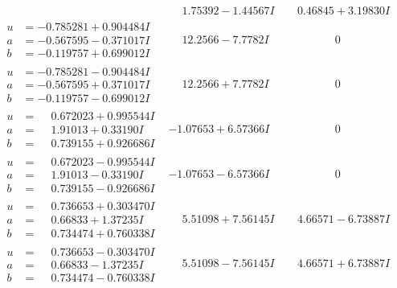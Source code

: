 \documentclass[1p]{elsarticle_modified}
\theoremstyle{definition}
\begin{document}
$$\begin{array}{c|c|c}
 & \phantom{-}1.75392 - 1.44567 I & \phantom{-}0.46845 + 3.19830 I \\ \hline\begin{aligned}
u &= -0.785281 + 0.904484 I \\
a &= -0.567595 - 0.371017 I \\
b &= -0.119757 + 0.699012 I\end{aligned}
 & \phantom{-}12.2566 - 7.7782 I & \phantom{-0.000000 } 0 \\ \hline\begin{aligned}
u &= -0.785281 - 0.904484 I \\
a &= -0.567595 + 0.371017 I \\
b &= -0.119757 - 0.699012 I\end{aligned}
 & \phantom{-}12.2566 + 7.7782 I & \phantom{-0.000000 } 0 \\ \hline\begin{aligned}
u &= \phantom{-}0.672023 + 0.995544 I \\
a &= \phantom{-}1.91013 + 0.33190 I \\
b &= \phantom{-}0.739155 + 0.926686 I\end{aligned}
 & -1.07653 + 6.57366 I & \phantom{-0.000000 } 0 \\ \hline\begin{aligned}
u &= \phantom{-}0.672023 - 0.995544 I \\
a &= \phantom{-}1.91013 - 0.33190 I \\
b &= \phantom{-}0.739155 - 0.926686 I\end{aligned}
 & -1.07653 - 6.57366 I & \phantom{-0.000000 } 0 \\ \hline\begin{aligned}
u &= \phantom{-}0.736653 + 0.303470 I \\
a &= \phantom{-}0.66833 + 1.37235 I \\
b &= \phantom{-}0.734474 + 0.760338 I\end{aligned}
 & \phantom{-}5.51098 + 7.56145 I & \phantom{-}4.66571 - 6.73887 I \\ \hline\begin{aligned}
u &= \phantom{-}0.736653 - 0.303470 I \\
a &= \phantom{-}0.66833 - 1.37235 I \\
b &= \phantom{-}0.734474 - 0.760338 I\end{aligned}
 & \phantom{-}5.51098 - 7.56145 I & \phantom{-}4.66571 + 6.73887 I \\ \hline\begin{aligned}

\end{aligned}
\end{array}$$
\end{document}
